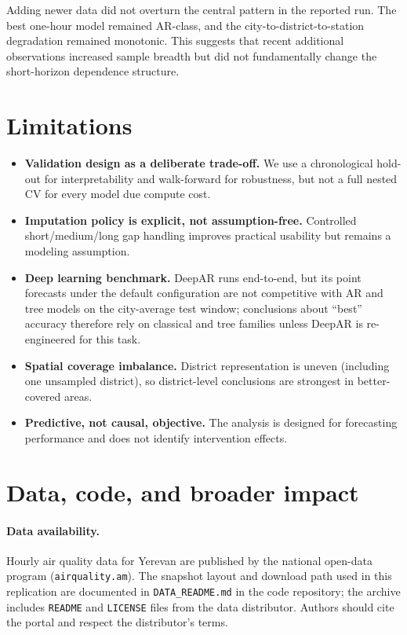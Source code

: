 \documentclass[11pt,a4paper]{article}
\begin{document}
Adding newer data did not overturn the central pattern in the reported run. The best one-hour model remained AR-class, and the city-to-district-to-station degradation remained monotonic. This suggests that recent additional observations increased sample breadth but did not fundamentally change the short-horizon dependence structure.

\section{Limitations}
\label{sec:limitations}

\begin{itemize}
  \item \textbf{Validation design as a deliberate trade-off.} We use a chronological hold-out for interpretability and walk-forward for robustness, but not a full nested CV for every model due compute cost.
  \item \textbf{Imputation policy is explicit, not assumption-free.} Controlled short/medium/long gap handling improves practical usability but remains a modeling assumption.
  \item \textbf{Deep learning benchmark.} DeepAR runs end-to-end, but its point forecasts under the default configuration are not competitive with AR and tree models on the city-average test window; conclusions about ``best'' accuracy therefore rely on classical and tree families unless DeepAR is re-engineered for this task.
  \item \textbf{Spatial coverage imbalance.} District representation is uneven (including one unsampled district), so district-level conclusions are strongest in better-covered areas.
  \item \textbf{Predictive, not causal, objective.} The analysis is designed for forecasting performance and does not identify intervention effects.
\end{itemize}

\section{Data, code, and broader impact}
\label{sec:availability}

\paragraph{Data availability.}
Hourly air quality data for Yerevan are published by the national open-data program (\texttt{airquality.am}). The snapshot layout and download path used in this replication are documented in \texttt{DATA\_README.md} in the code repository; the archive includes \texttt{README} and \texttt{LICENSE} files from the data distributor. Authors should cite the portal and respect the distributor's terms.
\end{document}
